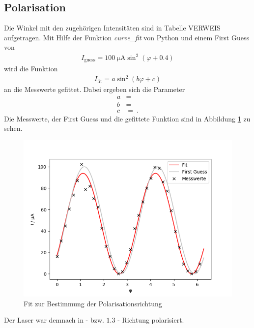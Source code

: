 \subsection{Polarisation}
Die Winkel mit den zugehörigen Intensitäten sind in Tabelle VERWEIS aufgetragen. Mit Hilfe der Funktion \textit{curve\_fit} von Python und einem First Guess von
\begin{align*}
	I_\text{guess} = \SI{100}{\micro\ampere}\sin^2(\varphi + 0.4)
\end{align*}
wird die Funktion
\begin{align*}
	I_\text{fit} = a\sin^2\left(b\varphi + c\right)
\end{align*}
an die Messwerte gefittet. Dabei ergeben sich die Parameter
\begin{align}
	a &=  \\
	b &=  \\
	c &=  \ .
\end{align}
Die Messwerte, der First Guess und die gefittete Funktion sind in Abbildung \ref{fig:fitPol} zu sehen.
\begin{figure}[h!]
	\centering
	\includegraphics[width=.6\textwidth]{Fit_Polarisation.png}
	\caption{Fit zur Bestimmung der Polarisationsrichtung}
	\label{fig:fitPol}
\end{figure}
Der Laser war demnach in - bzw. $1.3$ - Richtung polarisiert.